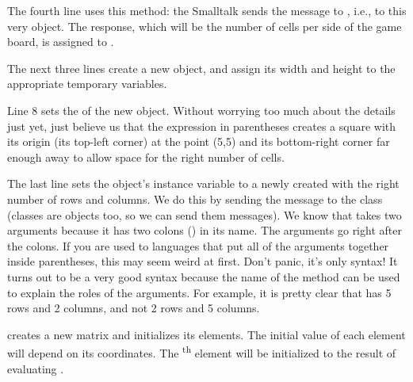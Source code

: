 \documentclass[a4paper,10pt,twoside]{book}
\begin{document}
 
The fourth line uses this method: 
the Smalltalk  sends the message  to , i.e., to this very object.  
The response, which will be the number of cells per side of the game board, is assigned to .

The next three lines create a new  object, and assign its width and height to the appropriate temporary variables. 

Line 8 sets the  of the new object.
Without worrying too much about the details just yet, just believe us that the expression in parentheses creates a square with its origin (\ie its top-left corner) at the point (5,5) and its bottom-right corner far enough away to allow space for the right number of cells.

The last line sets the  object's instance variable  to a newly created  with the right number of rows and columns.   We do this by sending the message  to the  class (classes are objects too, so we can send them messages).  We know that  takes two arguments because it has two colons (\ct{:}) in its name.   The arguments go right after the colons.
If you are used to languages that put all of the arguments together inside parentheses, this may seem weird at first.  Don't panic, it's only syntax!
It turns out to be a very good syntax because the name of the method can be used to explain the roles of the arguments.  For example, it is pretty clear that  has 5 rows and 2 columns, and not 2 rows and 5 columns.

 creates a new  matrix and initializes its elements.  The initial value of each element will depend on its coordinates.  The \textsuperscript{th} element will be initialized to the result of evaluating .  

\end{document}
